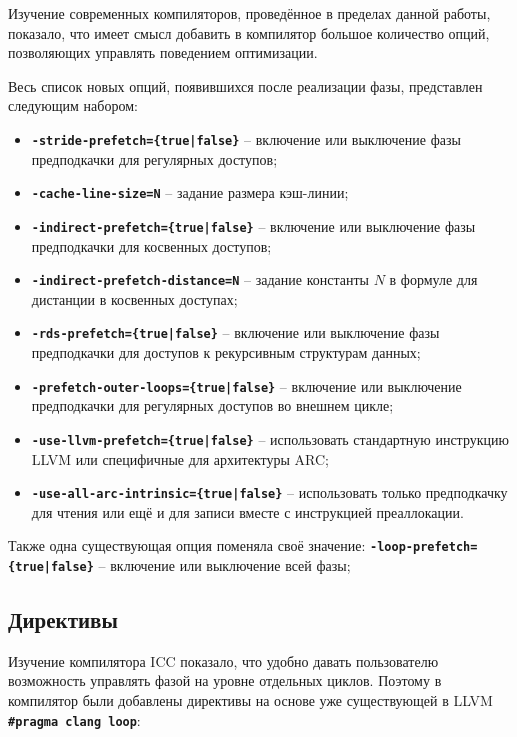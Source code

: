 \documentclass[12pt,a4paper,oneside]{article}
\begin{document}
\indent

Изучение современных компиляторов, проведённое в пределах данной работы, показало, что имеет смысл добавить в компилятор большое количество опций, позволяющих управлять поведением оптимизации.

Весь список новых опций, появившихся после реализации фазы, представлен следующим набором:

\begin{itemize}
\item \texttt{\textbf{-stride-prefetch=\{true|false\}}} -- включение или выключение фазы предподкачки для регулярных доступов;
\item \texttt{\textbf{-cache-line-size=N}} -- задание размера кэш-линии;
\item \texttt{\textbf{-indirect-prefetch=\{true|false\}}} -- включение или выключение фазы предподкачки для косвенных доступов;
\item \texttt{\textbf{-indirect-prefetch-distance=N}} -- задание константы $N$ в формуле для дистанции в косвенных доступах;
\item \texttt{\textbf{-rds-prefetch=\{true|false\}}} -- включение или выключение фазы предподкачки для доступов к рекурсивным структурам данных;
\item \texttt{\textbf{-prefetch-outer-loops=\{true|false\}}} -- включение или выключение предподкачки для регулярных доступов во внешнем цикле;
\item \texttt{\textbf{-use-llvm-prefetch=\{true|false\}}} -- использовать стандартную инструкцию LLVM или специфичные для архитектуры ARC;
\item \texttt{\textbf{-use-all-arc-intrinsic=\{true|false\}}} -- использовать только предподкачку для чтения или ещё и для записи вместе с инструкцией преаллокации.
\end{itemize}

Также одна существующая опция поменяла своё значение:\linebreak
\texttt{\textbf{-loop-prefetch=\{true|false\}}} -- включение или выключение всей фазы;

\subsection{Директивы}

\indent 
Изучение компилятора ICC показало, что удобно давать пользователю возможность управлять фазой на уровне отдельных циклов. Поэтому в компилятор были добавлены директивы на основе уже существующей в LLVM \texttt{\textbf{\#pragma clang loop}}:
\end{document}
